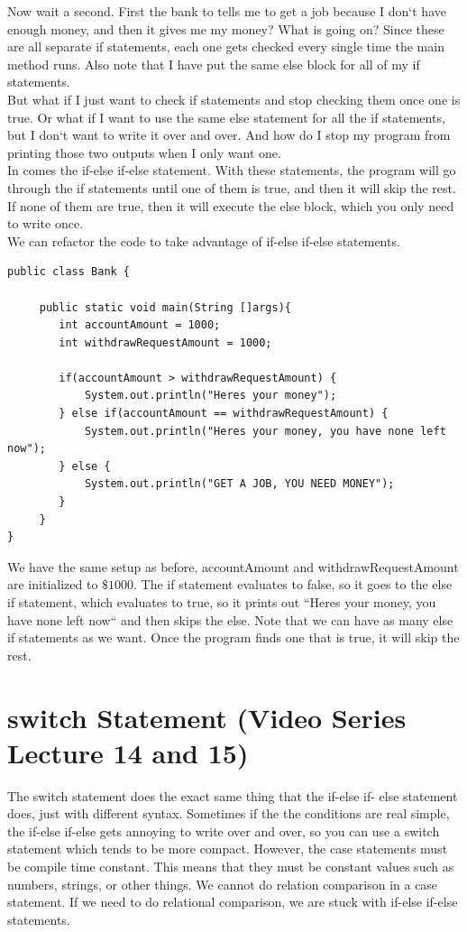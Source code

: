 \documentclass[11]{article}
\begin{document}
Now wait a second. First the bank to tells me to get a job because I don`t have enough money, and then it gives me my money? What is going on? Since these are all separate if statements, each one gets checked every single time the main method runs. Also note that I have put the same else block for all of my if statements.\\

But what if I just want to check if statements and stop checking them once one is true. Or what if I want to use the same else statement for all the if statements, but I don`t want to write it over and over. And how do I stop my program from printing those two outputs when I only want one.\\

In comes the if-else if-else statement. With these statements, the program will go through the if statements until one of them is true, and then it will skip the rest. If none of them are true, then it will execute the else block, which you only need to write once.\\

We can refactor the code to take advantage of if-else if-else statements.
\begin{lstlisting}
public class Bank {

     public static void main(String []args){
        int accountAmount = 1000;
        int withdrawRequestAmount = 1000;
        
        if(accountAmount > withdrawRequestAmount) {
            System.out.println("Heres your money");
        } else if(accountAmount == withdrawRequestAmount) {
            System.out.println("Heres your money, you have none left now");
        } else {
            System.out.println("GET A JOB, YOU NEED MONEY");
        }
     }
}
\end{lstlisting}
We have the same setup as before, accountAmount and withdrawRequestAmount are initialized to $\$1000$.
The if statement evaluates to false, so it goes to the else if statement, which evaluates to true, so it prints out ``Heres your money, you have none left now`` and then skips the else. Note that we can have as many else if statements as we want. Once the program finds one that is true, it will skip the rest.
\section{switch Statement (Video Series Lecture 14 and 15)}
The switch statement does the exact same thing that the if-else if- else statement does, just with different syntax. Sometimes if the the conditions are real simple, the if-else if-else gets annoying to write over and over, so you can use a switch statement which tends to be more compact. However, the case statements must be compile time constant. This means that they must be constant values such as numbers, strings, or other things. We cannot do relation comparison in a case statement. If we need to do relational comparison, we are stuck with if-else if-else statements.
\end{document}
